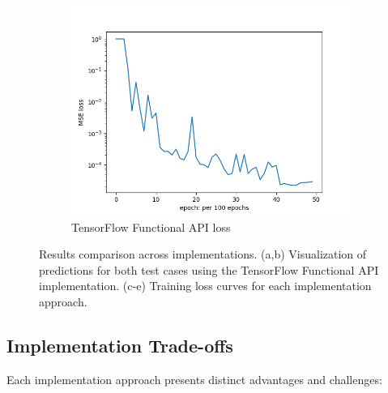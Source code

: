 \documentclass[10pt,journal,compsoc,onecolumn]{IEEEtran}
\begin{document}
\begin{figure}[t]
\begin{subfigure}[b]{0.32\linewidth}
        \includegraphics[width=\linewidth]{../../results/functional-api/low-frequency/loss}
        \caption{TensorFlow Functional API loss}
    \end{subfigure}
    \caption{Results comparison across implementations. (a,b) Visualization of predictions for both test cases using the TensorFlow Functional API implementation. (c-e) Training loss curves for each implementation approach.}
    \label{fig:results}
\end{figure}

\subsection{Implementation Trade-offs}
Each implementation approach presents distinct advantages and challenges:
\end{document}
